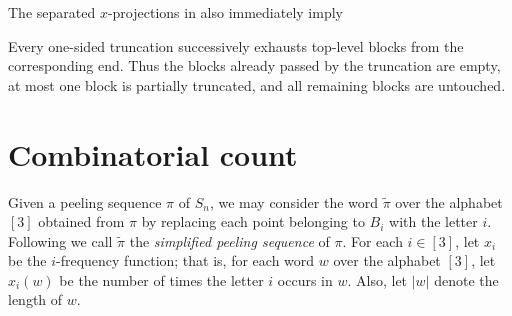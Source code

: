 \documentclass[11pt]{amsart}
\theoremstyle{definition}
\begin{document}
The separated $x$-projections in  also immediately imply
\begin{properties}
\setcounter{propertiesi}{1}
    \item \label{property2} Every one-sided truncation successively exhausts top-level blocks from the corresponding end. Thus the blocks already passed by the truncation are empty, at most one block is partially truncated, and all remaining blocks are untouched.
\end{properties}


\section{Combinatorial count}\label{sec:counting}
Given a peeling sequence $\pi$ of $S_n$, we 
may consider the word $\tilde{\pi}$ over the alphabet $[3]$ obtained 
from $\pi$ by replacing each point belonging to 
$B_i$ with the letter $i$. Following \cite{dumitrescuToth2025peeling} we call $\tilde{\pi}$ 
the \emph{simplified peeling sequence} of 
$\pi$. For each $i\in [3]$, let $x_i$ be the $i$-frequency function; that is, for each word $w$ over the alphabet $[3]$, let $x_i(w)$ be the number of times the letter $i$ occurs in $w$. Also, let $|w|$ denote the length of $w$.
\end{document}
